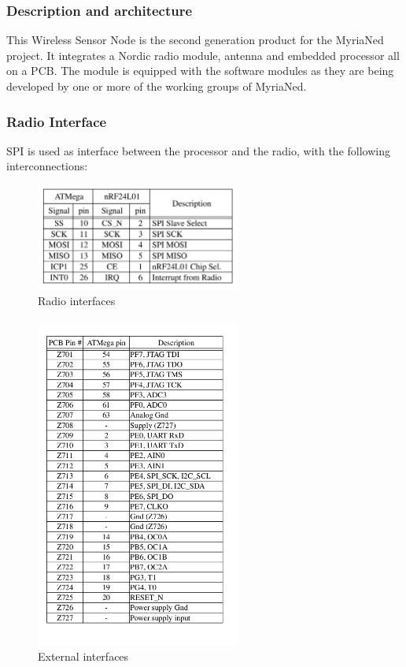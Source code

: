 \documentclass[a4paper,10pt]{report}
\begin{document}
\subsubsection{Description and architecture}
This Wireless Sensor Node is the second generation product for the MyriaNed project. It integrates a Nordic radio module, antenna and embedded processor all on a PCB. The module is equipped with the software modules as they are being developed by one or more of the working groups of MyriaNed.
\subsubsection{Radio Interface}
SPI is used as interface between the processor and the radio, with the following interconnections:
\begin{figure}[!h]
 \centering
    \includegraphics[width=0.6\textwidth]{table1}
  \caption{Radio interfaces}
  \label{table1}
\end{figure}
\paragraph*{}
\begin{figure}[!h]
 \centering
    \includegraphics[width=0.6\textwidth]{table2}
  \caption{External interfaces}
  \label{table2}
\end{figure}
\end{document}
